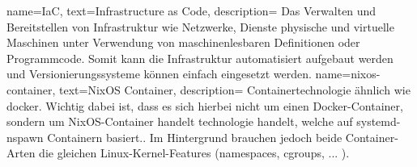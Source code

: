                 { name={IaC}, text={Infrastructure as Code}, description={{
    Das Verwalten und Bereitstellen von Infrastruktur wie Netzwerke, Dienste physische und virtuelle Maschinen unter Verwendung von maschinenlesbaren Definitionen oder Programmcode.
    Somit kann die Infrastruktur automatisiert aufgebaut werden und Versionierungssysteme können einfach eingesetzt werden.
}}}
    { name={nixos-container}, text={NixOS Container}, description={{
    Containertechnologie ähnlich wie docker.
    Wichtig dabei ist, dass es sich hierbei nicht um einen Docker-Container, sondern um NixOS-Container handelt technologie handelt, welche auf systemd-nspawn Containern basiert..
    Im Hintergrund brauchen jedoch beide Container-Arten die gleichen Linux-Kernel-Features (namespaces, cgroups, ... ).
}}}
